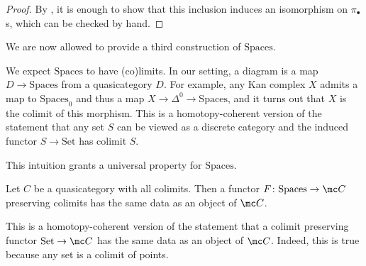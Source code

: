\documentclass[../notes.tex]{subfiles}
\begin{document}
\begin{proof}
	By , it is enough to show that this inclusion induces an isomorphism on $\pi_\bullet$s, which can be checked by hand.
\end{proof}
We are now allowed to provide a third construction of $\mathrm{Spaces}$.
\begin{remark}
	We expect $\mathrm{Spaces}$ to have (co)limits. In our setting, a diagram is a map $D\to\mathrm{Spaces}$ from a quasicategory $D$. For example, any Kan complex $X$ admits a map to $\mathrm{Spaces}_0$ and thus a map $X\to\Delta^0\to\mathrm{Spaces}$, and it turns out that $X$ is the colimit of this morphism. This is a homotopy-coherent version of the statement that any set $S$ can be viewed as a discrete category and the induced functor $S\to\mathrm{Set}$ has colimit $S$.
\end{remark}
This intuition grants a universal property for $\mathrm{Spaces}$.
\begin{theorem}
	Let $C$ be a quasicategory with all colimits. Then a functor $F\colon\mathrm{Spaces}\to\mc C$ preserving colimits has the same data as an object of $\mc C$.
\end{theorem}
\begin{remark}
	This is a homotopy-coherent version of the statement that a colimit preserving functor $\mathrm{Set}\to\mc C$ has the same data as an object of $\mc C$. Indeed, this is true because any set is a colimit of points.
\end{remark}
\end{document}
